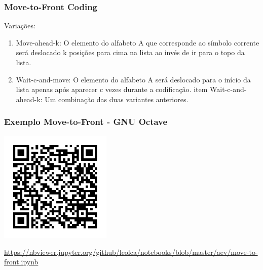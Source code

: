 \begin{frame}%
  \frametitle{Move-to-Front Coding}
  Variações:
  \begin{enumerate}
  \item Move-ahead-k: O elemento do alfabeto A que corresponde ao símbolo corrente será deslocado k posições para cima na lista ao
          invés de ir para o topo da lista.
  \item Wait-c-and-move: O elemento do alfabeto A será deslocado para o início da lista apenas após aparecer c vezes durante a
          codificação. 
  item Wait-c-and-ahead-k: Um combinação das duas variantes anteriores.
  \end{enumerate}

\end{frame} 

\begin{frame}%
  \frametitle{Exemplo Move-to-Front - GNU Octave}
  \centering
  \includegraphics[width=0.4\textwidth]{images/qrcode-jupyter-m2f.pdf}

  \url{https://nbviewer.jupyter.org/github/leolca/notebooks/blob/master/aev/move-to-front.ipynb}
\end{frame} 




